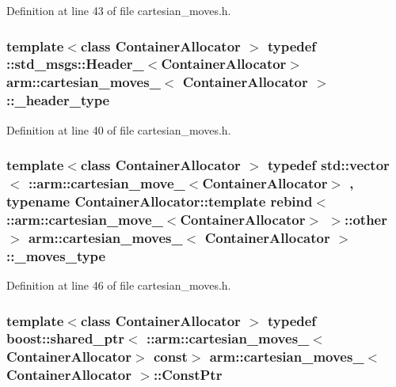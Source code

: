 \-Definition at line 43 of file cartesian\-\_\-moves.\-h.

\subsubsection[{\-\_\-header\-\_\-type}]{\setlength{\rightskip}{0pt plus 5cm}template$<$class Container\-Allocator $>$ typedef \-::std\-\_\-msgs\-::\-Header\-\_\-$<$\-Container\-Allocator$>$ {\bf arm\-::cartesian\-\_\-moves\-\_\-}$<$ \-Container\-Allocator $>$\-::{\bf \-\_\-header\-\_\-type}}\label{structarm_1_1cartesian__moves___a91b6ba07f1952932feefe44f96aac012}


\-Definition at line 40 of file cartesian\-\_\-moves.\-h.

\subsubsection[{\-\_\-moves\-\_\-type}]{\setlength{\rightskip}{0pt plus 5cm}template$<$class Container\-Allocator $>$ typedef std\-::vector$<$ \-::{\bf arm\-::cartesian\-\_\-move\-\_\-}$<$\-Container\-Allocator$>$ , typename \-Container\-Allocator\-::template rebind$<$ \-::{\bf arm\-::cartesian\-\_\-move\-\_\-}$<$\-Container\-Allocator$>$ $>$\-::other $>$ {\bf arm\-::cartesian\-\_\-moves\-\_\-}$<$ \-Container\-Allocator $>$\-::{\bf \-\_\-moves\-\_\-type}}\label{structarm_1_1cartesian__moves___a42dac8a93f36209c6f2587aa4e724e02}


\-Definition at line 46 of file cartesian\-\_\-moves.\-h.

\subsubsection[{\-Const\-Ptr}]{\setlength{\rightskip}{0pt plus 5cm}template$<$class Container\-Allocator $>$ typedef boost\-::shared\-\_\-ptr$<$ \-::{\bf arm\-::cartesian\-\_\-moves\-\_\-}$<$\-Container\-Allocator$>$ const$>$ {\bf arm\-::cartesian\-\_\-moves\-\_\-}$<$ \-Container\-Allocator $>$\-::{\bf \-Const\-Ptr}}\label{structarm_1_1cartesian__moves___a67d795ed2a3b937e0fd0af5685117006}


